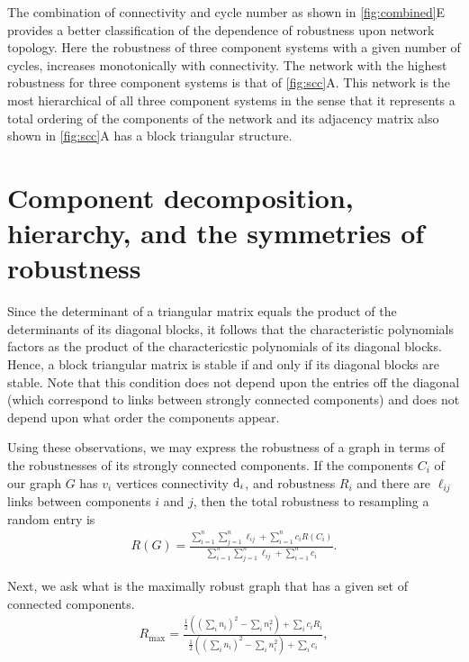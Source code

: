 The combination of connectivity and cycle number as shown in \ref{fig:combined}E provides a better classification of the dependence of robustness upon network topology. Here the robustness of three component systems with a given number of cycles, increases monotonically with connectivity. The network with the highest robustness for three component systems is that of \ref{fig:scc}A. This network is the most hierarchical of all three component systems in the sense that it represents a total ordering of the components of the network and its adjacency matrix also shown in \ref{fig:scc}A has a block triangular structure.

\section{Component decomposition, hierarchy, and the symmetries of robustness}

Since the determinant of a triangular matrix equals the product of the determinants of its diagonal blocks, it follows that the characteristic polynomials factors as the product of the charactericstic polynomials of its diagonal blocks.  Hence, a block triangular matrix is stable if and only if its diagonal blocks are stable.  Note that this condition does not depend upon the entries off the diagonal (which correspond to links between strongly connected components) and does not depend upon what order the components appear.

Using these observations, we may express the robustness of a graph in terms of the robustnesses of its strongly connected components.
If the components $C_i$ of our graph $G$ has $v_i$ vertices connectivity $\mathrm{d}_i$, and robustness $R_i$ and there are $\ell_{ij}$ links between components $i$ and $j$, then the total robustness to resampling a random entry is
\begin{align}
R(G) = \frac{\sum_{i=1}^n \sum_{j=1}^n \ell_{ij} + \sum_{i=1}^n c_i R(C_i)}
            {\sum_{i=1}^n \sum_{j=1}^n \ell_{ij} + \sum_{i=1}^n c_i}. \label{eq:sccrobustness}
\end{align}

Next, we ask what is the maximally robust graph that has a given set of connected components.
\begin{align}
R_{\mathrm{max}} = \frac{\frac{1}{2} ((\sum_i n_i)^2 - \sum_i n_i^2) + \sum_i c_i R_i}{\frac{1}{2} ((\sum_i n_i)^2 - \sum_i n_i^2) + \sum_i c_i}, \label{eq:sccmaxrobustness}
\end{align}


